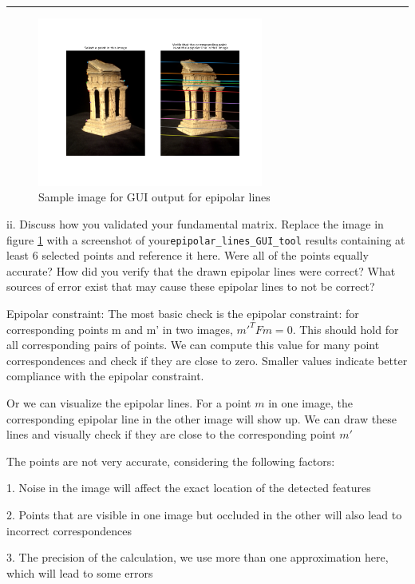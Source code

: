 \documentclass[onecolumn,10pt]{article}
\begin{document}
\hrule

\begin{figure}[h]
  \centering
  \includegraphics[width=0.66\textwidth]{media/Epipolar line.png}
  \caption{Sample image for GUI output for epipolar lines}
  \label{fig:epipolar lines}
\end{figure}

ii. Discuss how you validated your fundamental matrix. Replace the image in figure \ref{fig:epipolar lines} with a screenshot of your{\tt  epipolar\_lines\_GUI\_tool} results containing at least 6 selected points and reference it here. Were all of the points equally accurate? How did you verify that the drawn epipolar lines were correct? What sources of error exist that may cause these epipolar lines to not be correct?

Epipolar constraint: The most basic check is the epipolar constraint: for corresponding points m and m' in two images, $m'^T F m = 0$. This should hold for all corresponding pairs of points. We can compute this value for many point correspondences and check if they are close to zero. Smaller values indicate better compliance with the epipolar constraint.

Or we can visualize the epipolar lines. For a point $m$ in one image, the corresponding epipolar line in the other image will show up. We can draw these lines and visually check if they are close to the corresponding point $m'$

The points are not very accurate, considering the following factors:

1. Noise in the image will affect the exact location of the detected features

2. Points that are visible in one image but occluded in the other will also lead to incorrect correspondences

3. The precision of the calculation, we use more than one approximation here, which will lead to some errors
\end{document}
